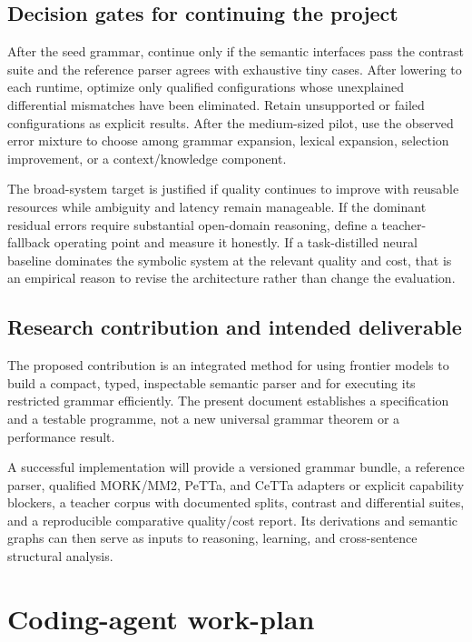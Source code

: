 \documentclass[11pt,a4paper]{article}
\begin{document}
\subsection{Decision gates for continuing the project}
After the seed grammar, continue only if the semantic interfaces pass the
contrast suite and the reference parser agrees with exhaustive tiny cases.
After lowering to each runtime, optimize only qualified configurations
whose unexplained differential mismatches have been eliminated. Retain
unsupported or failed configurations as explicit results. After the medium-sized pilot, use the observed error mixture
to choose among grammar expansion, lexical expansion, selection improvement,
or a context/knowledge component.

The broad-system target is justified if quality continues to improve with
reusable resources while ambiguity and latency remain manageable. If the
dominant residual errors require substantial open-domain reasoning, define a
teacher-fallback operating point and measure it honestly. If a task-distilled neural
baseline dominates the symbolic system at the relevant quality and cost, that
is an empirical reason to revise the architecture rather than change the
evaluation.

\subsection{Research contribution and intended deliverable}
The proposed contribution is an integrated method for using frontier models
to build a compact, typed, inspectable semantic parser and for executing its
restricted grammar efficiently. The present document establishes a
specification and a testable programme, not a new universal grammar theorem
or a performance result.

A successful implementation will provide a versioned grammar bundle, a
reference parser, qualified MORK/MM2, PeTTa, and CeTTa adapters or explicit
capability blockers, a teacher corpus with documented splits, contrast and
differential suites, and a reproducible comparative quality/cost report. Its derivations and semantic graphs can then serve as inputs to
reasoning, learning, and cross-sentence structural analysis.

\clearpage
\appendix
{}
\section{Coding-agent work-plan}\label{app:workplan}
\end{document}
